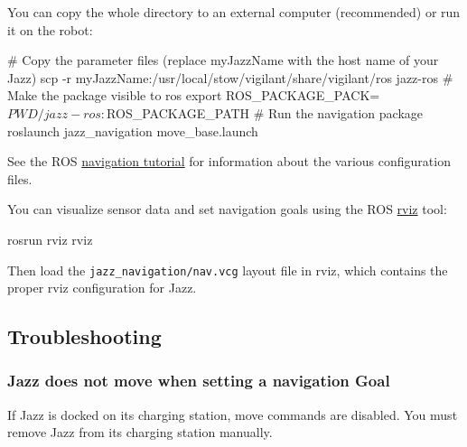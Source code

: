 You can copy the whole directory to an external computer (recommended) or run
it on the robot:

\begin{shell}
# Copy the parameter files (replace myJazzName with the host name of your Jazz)
scp -r myJazzName:/usr/local/stow/vigilant/share/vigilant/ros jazz-ros
# Make the package visible to ros
export ROS_PACKAGE_PACK=$PWD/jazz-ros:$ROS_PACKAGE_PATH
# Run the navigation package
roslaunch jazz_navigation move_base.launch
\end{shell}

See the ROS
\href{http://www.ros.org/wiki/navigation/Tutorials/RobotSetup}{navigation tutorial}
for information about the various configuration files.

You can visualize sensor data and set navigation goals using the ROS
\href{http://www.ros.org/wiki/navigation/Tutorials/Using%20rviz%20with%20the%20Navigation%20Stack}{rviz}
tool:

\begin{shell}
rosrun rviz rviz
\end{shell}

Then load the \lstinline|jazz_navigation/nav.vcg| layout file in rviz, which
contains the proper rviz configuration for Jazz.

\subsection{Troubleshooting}

\subsubsection{Jazz does not move when setting a navigation Goal}

If Jazz is docked on its charging station, move commands are disabled. You must
remove Jazz from its charging station manually.

